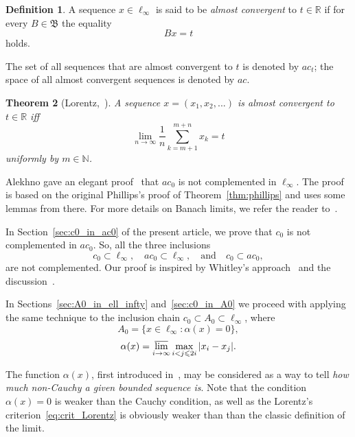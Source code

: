 \documentclass[a4paper,14pt]{article} %
\theoremstyle{plain}
\newtheorem{theorem}{Theorem}[section]
\theoremstyle{definition}
\newtheorem{definition}[theorem]{Definition}
\begin{document}
\begin{definition}
	A sequence $x\in \ell_\infty$ is said to be \emph{almost convergent} to $t\in \mathbb{R}$
	if for every $B\in\mathfrak{B}$ the equality
	\begin{equation}
		Bx = t
	\end{equation}
	holds.
\end{definition}
The set of all sequences that are almost convergent to $t$ is denoted by $ac_t$;
the space of all almost convergent sequences is denoted by $ac$.

\begin{theorem}[Lorentz,~\cite{lorentz1948contribution}]
	A sequence $x=(x_1,x_2,...)$ is almost convergent to $t\in\mathbb{R}$ iff
	\begin{equation}
		\label{eq:crit_Lorentz}
		\lim_{n\to\infty} \frac{1}{n} \sum_{k=m+1}^{m+n} x_k = t
	\end{equation}
	uniformly by $m\in\mathbb{N}$.
\end{theorem}

Alekhno gave an elegant proof~\cite[Theorem 8]{alekhno2006propertiesII}
that $ac_0$ is not complemented in $\ell_\infty$.
The proof is based on the original Phillips's proof of Theorem~\ref{thm:phillips}
and uses some lemmas from there.
For more details on Banach limits, we refer the reader to~\cite{sucheston1967banach,Eberlein,semenov2020geomBL}.

In Section~\ref{sec:c0_in_ac0} of the present article, we prove that $c_0$ is not complemented in $ac_0$.
So, all the three inclusions
\begin{equation}
	c_0 \subset \ell_\infty,
	\quad
	ac_0 \subset \ell_\infty,
	\quad\mbox{and}\quad
	c_0 \subset ac_0,
\end{equation}
are not complemented.
Our proof is inspired by Whitley's approach~\cite{whitley1968projecting}
and the discussion~\cite{mathSE_Phillips}.

In Sections~\ref{sec:A0_in_ell_infty} and~\ref{sec:c0_in_A0}
we proceed with applying the same technique to the inclusion chain $c_0 \subset A_0 \subset \ell_\infty$,
where
\begin{equation}
	A_0 = \{x\in\ell_\infty: \alpha(x) = 0\}
	,
\end{equation}
\begin{equation}
	\alpha(x) = \varlimsup_{i\to\infty} \max_{i<j\leqslant 2i} |x_i - x_j|
	.
\end{equation}

The function $\alpha(x)$, first introduced in~\cite{our-vzms-2018},
may be considered as a way to tell \emph{how much non-Cauchy a given bounded sequence is}.
Note that the condition $\alpha(x) =0$ is weaker than the Cauchy condition,
as well as the Lorentz's criterion~\eqref{eq:crit_Lorentz} is obviously weaker than
than the classic definition of the limit.
\end{document}
